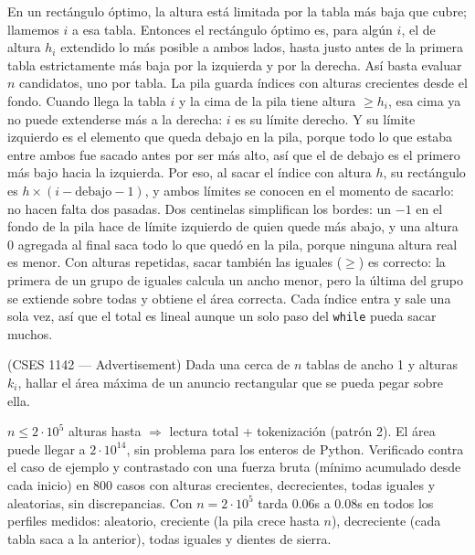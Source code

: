  En un rectángulo óptimo, la altura está limitada por la tabla más baja que cubre; llamemos $i$ a esa tabla. Entonces el rectángulo óptimo es, para algún $i$, el de altura $h_i$ extendido lo más posible a ambos lados, hasta justo antes de la primera tabla estrictamente más baja por la izquierda y por la derecha. Así basta evaluar $n$ candidatos, uno por tabla. La pila guarda índices con alturas crecientes desde el fondo. Cuando llega la tabla $i$ y la cima de la pila tiene altura $\ge h_i$, esa cima ya no puede extenderse más a la derecha: $i$ es su límite derecho. Y su límite izquierdo es el elemento que queda debajo en la pila, porque todo lo que estaba entre ambos fue sacado antes por ser más alto, así que el de debajo es el primero más bajo hacia la izquierda. Por eso, al sacar el índice con altura $h$, su rectángulo es $h \times (i - \text{debajo} - 1)$, y ambos límites se conocen en el momento de sacarlo: no hacen falta dos pasadas. Dos centinelas simplifican los bordes: un $-1$ en el fondo de la pila hace de límite izquierdo de quien quede más abajo, y una altura $0$ agregada al final saca todo lo que quedó en la pila, porque ninguna altura real es menor. Con alturas repetidas, sacar también las iguales ($\ge$) es correcto: la primera de un grupo de iguales calcula un ancho menor, pero la última del grupo se extiende sobre todas y obtiene el área correcta. Cada índice entra y sale una sola vez, así que el total es lineal aunque un solo paso del \texttt{while} pueda sacar muchos.


(CSES 1142 — Advertisement) Dada una cerca de $n$ tablas de ancho 1 y alturas $k_i$, hallar el área máxima de un anuncio rectangular que se pueda pegar sobre ella.

 $n \le 2\cdot10^5$ alturas hasta  $\Rightarrow$ lectura total + tokenización (patrón 2). El área puede llegar a $2\cdot10^{14}$, sin problema para los enteros de Python. Verificado contra el caso de ejemplo y contrastado con una fuerza bruta  (mínimo acumulado desde cada inicio) en 800 casos con alturas crecientes, decrecientes, todas iguales y aleatorias, sin discrepancias. Con $n = 2\cdot10^5$ tarda \aprox{}0.06s a \aprox{}0.08s en todos los perfiles medidos: aleatorio, creciente (la pila crece hasta $n$), decreciente (cada tabla saca a la anterior), todas iguales y dientes de sierra.


